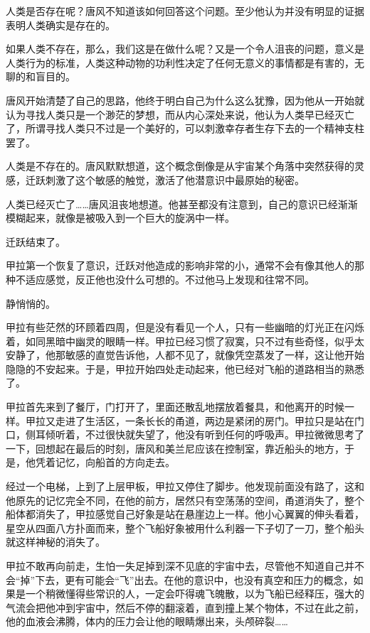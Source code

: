 人类是否存在呢？唐风不知道该如何回答这个问题。至少他认为并没有明显的证据表明人类确实是存在的。 

如果人类不存在，那么，我们这是在做什么呢？又是一个令人沮丧的问题，意义是人类行为的标准，人类这种动物的功利性决定了任何无意义的事情都是有害的，无聊的和盲目的。 

唐风开始清楚了自己的思路，他终于明白自己为什么这么犹豫，因为他从一开始就认为寻找人类只是一个渺茫的梦想，而从内心深处来说，他认为人类早已经灭亡了，所谓寻找人类只不过是一个美好的，可以刺激幸存者生存下去的一个精神支柱罢了。 

人类是不存在的。唐风默默想道，这个概念倒像是从宇宙某个角落中突然获得的灵感，迁跃刺激了这个敏感的触觉，激活了他潜意识中最原始的秘密。 

人类已经灭亡了……唐风沮丧地想道。他甚至都没有注意到，自己的意识已经渐渐模糊起来，就像是被吸入到一个巨大的旋涡中一样。 

迁跃结束了。 

甲拉第一个恢复了意识，迁跃对他造成的影响非常的小，通常不会有像其他人的那种不适应感觉，反正他也没什么可想的。不过他马上发现和往常不同。 

静悄悄的。 

甲拉有些茫然的环顾着四周，但是没有看见一个人，只有一些幽暗的灯光正在闪烁着，如同黑暗中幽灵的眼睛一样。甲拉已经习惯了寂寞，只不过有些奇怪，似乎太安静了，他那敏感的直觉告诉他，人都不见了，就像凭空蒸发了一样，这让他开始隐隐的不安起来。于是，甲拉开始四处走动起来，他已经对飞船的道路相当的熟悉了。 

甲拉首先来到了餐厅，门打开了，里面还散乱地摆放着餐具，和他离开的时候一样。甲拉又走进了生活区，一条长长的甬道，两边是紧闭的房门。甲拉只是站在门口，侧耳倾听着，不过很快就失望了，他没有听到任何的呼吸声。甲拉微微思考了一下，回想起在最后的时刻，唐风和美兰尼应该在控制室，靠近船头的地方，于是，他凭着记忆，向船首的方向走去。 

经过一个电梯，上到了上层甲板，甲拉又停住了脚步。他发现前面没有路了，这和他原先的记忆完全不同，在他的前方，居然只有空荡荡的空间，甬道消失了，整个船体都消失了，甲拉感觉自己好象是站在悬崖边上一样。他小心翼翼的伸头看着，星空从四面八方扑面而来，整个飞船好象被用什么利器一下子切了一刀，整个船头就这样神秘的消失了。 

甲拉不敢再向前走，生怕一失足掉到深不见底的宇宙中去，尽管他不知道自己并不会“掉”下去，更有可能会“飞”出去。在他的意识中，也没有真空和压力的概念，如果是一个稍微懂得些常识的人，一定会吓得魂飞魄散，以为飞船已经释压，强大的气流会把他冲到宇宙中，然后不停的翻滚着，直到撞上某个物体，不过在此之前，他的血液会沸腾，体内的压力会让他的眼睛爆出来，头颅碎裂…… 

